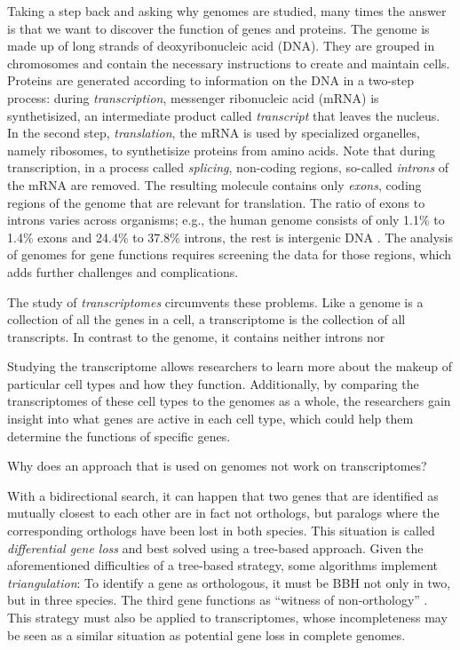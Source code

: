 Taking a step back and asking why genomes are studied, many times the answer is
that we want to discover the function of genes and proteins. The genome is made
up of long strands of deoxyribonucleic acid (DNA). They are grouped in
chromosomes and contain the necessary instructions to create and maintain cells.
Proteins are generated according to information on the DNA in a two-step
process: during \emph{transcription}, messenger ribonucleic acid (mRNA) is
synthetisized, an intermediate product called \emph{transcript} that leaves the
nucleus. In the second step, \emph{translation}, the mRNA is used by
specialized organelles, namely ribosomes, to synthetisize proteins from amino
acids. Note that during transcription, in a process called \emph{splicing},
non-coding regions, so-called \emph{introns} of the mRNA are removed. The
resulting molecule contains only \emph{exons}, coding regions of the genome
that are relevant for translation. The ratio of exons to introns varies across
organisms; e.g., the human genome consists of only 1.1\% to 1.4\% exons and
24.4\% to 37.8\% introns, the rest is intergenic DNA \citep{venter2001}. The
analysis of genomes for gene functions requires screening the data for those
regions, which adds further challenges and complications.

The study of \emph{transcriptomes} circumvents these problems. Like a genome is
a collection of all the genes in a cell, a transcriptome is the collection of
all transcripts. In contrast to the genome, it contains neither introns nor 

Studying the transcriptome allows researchers to learn more about the makeup of
particular cell types and how they function. Additionally, by comparing the
transcriptomes of these cell types to the genomes as a whole, the researchers
gain insight into what genes are active in each cell type, which could help them
determine the functions of specific genes.

Why does an approach that is used on genomes not work on transcriptomes?

With a bidirectional search, it can happen that two genes that are identified as
mutually closest to each other are in fact not orthologs, but paralogs where the
corresponding orthologs have been lost in both species. This situation is called
\emph{differential gene loss} and best solved using a tree-based approach. Given
the aforementioned difficulties of a tree-based strategy, some algorithms
implement \emph{triangulation}: To identify a gene as orthologous, it must be
BBH not only in two, but in three species. The third gene functions as ``witness
of non-orthology'' \citep{dessimoz2006}. This strategy must also be applied to
transcriptomes, whose incompleteness may be seen as a similar situation as
potential gene loss in complete genomes.

